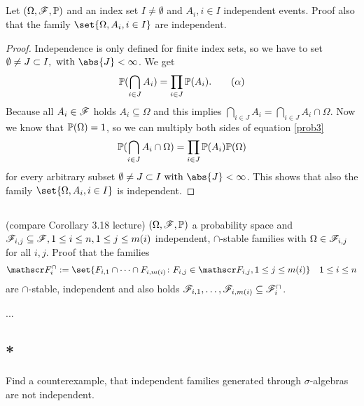 \subsection{}
Let $(\Omega, \mathscr{F}, \mathbb{P})$ and an index set $I \neq \emptyset$ and $A_i, i \in I$ independent events. Proof also that the family $\set{\Omega, A_i , i \in I}$ are independent.
\begin{proof}
	Independence is only defined for finite index sets, so we have to set $\emptyset \neq J \subset I, \with \abs{J} < \infty$. 
	We get
	\begin{align*}
		\mathbb{P}(\bigcap_{i \in J}A_i) = \prod_{i \in J}\mathbb{P}(A_i). \label{prob3}\tag{$\alpha$}
	\end{align*}
	Because all $A_i \in \mathscr{F}$ holds $A_i \subseteq \Omega$ and this implies $\bigcap_{i \in J} A_i = \bigcap_{i \in J} A_i \cap \Omega$. Now we know that $\mathbb{P}(\Omega) = 1$, so we can multiply both sides of equation \ref{prob3}
	\begin{align*}
		\mathbb{P}(\bigcap_{i \in J}A_i \cap \Omega) = \prod_{i \in J}\mathbb{P}(A_i)\mathbb{P}(\Omega)
	\end{align*}
	for every arbitrary subset $\emptyset \neq J \subset I \with \abs{J} < \infty$. 
	This shows that also the family $\set{\Omega, A_i , i \in I}$ is independent.
\end{proof}
\subsection{}(compare Corollary 3.18 lecture)
$(\Omega, \mathscr{F}, \mathbb{P})$ a probability space and $\mathscr{F}_{i,j} \subseteq \mathscr{F}, 1 \le i \le n, 1 \le j \le m(i)$ independent, $\cap$-stable families with $\Omega \in \mathscr{F}_{i,j}$ for all $i,j$. Proof that the families
\begin{align*}
	\F_i^{\cap} := \set{F_{i,1} \cap \cdots \cap F_{i, m(i)} \colon F_{i,j} \in \F_{i,j}, 1 \le j \le m(i)} \quad 1 \le i \le n
\end{align*}
are $\cap$-stable, independent and also holds $\mathscr{F}_{i,1},\dots, \mathscr{F}_{i,m(i)} \subseteq \mathscr{F}_i^{\cap}$.

\begin{solution}
	...
\end{solution}
\subsection{*}
Find a counterexample, that independent families generated through $\sigma$-algebras are not independent.

